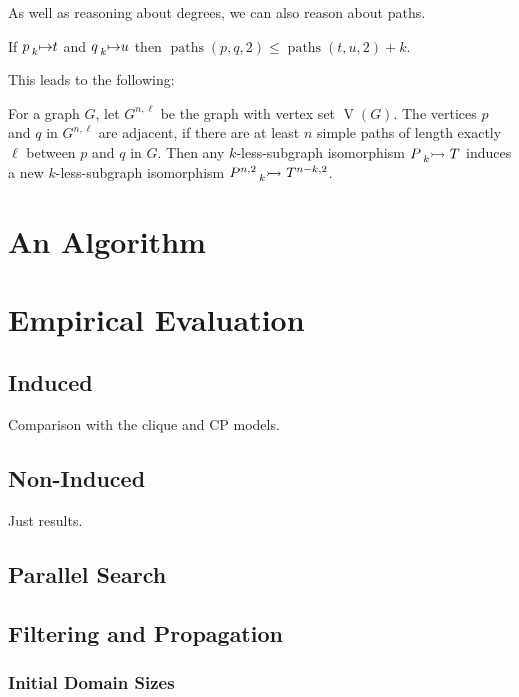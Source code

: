 \documentclass[letterpaper]{article}
\begin{document}
As well as reasoning about degrees, we can also reason about paths.

\begin{proposition}
    If $p \prescript{}{k}{\mapsto} t$ and $q \prescript{}{k}{\mapsto} u$ then
     $\operatorname{paths}(p, q, 2) \le \operatorname{paths}(t, u, 2) + k$.
\end{proposition}

This leads to the following:

\begin{proposition}
    For a graph $G$, let $G^{n, \ell}$ be the graph with vertex set $\operatorname{V}(G)$. The
    vertices $p$ and $q$ in $G^{n, \ell}$ are adjacent, if there are at least $n$ simple paths of
    length exactly $\ell$ between $p$ and $q$ in $G$. Then any $k$-less-subgraph isomorphism
    $P \prescript{}{k}{\rightarrowtail}\  T$ induces a new $k$-less-subgraph isomorphism
    $P^{n, 2}\prescript{}{k}{\rightarrowtail}\  T^{n - k, 2}$.
\end{proposition}

\section{An Algorithm}

\section{Empirical Evaluation}

\subsection{Induced}

Comparison with the clique and CP models.

\subsection{Non-Induced}

Just results.

\subsection{Parallel Search}

\subsection{Filtering and Propagation}

\subsubsection{Initial Domain Sizes}
\end{document}
